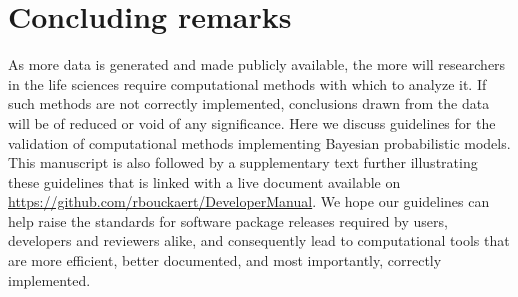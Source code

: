 \documentclass[oneside]{article}
\begin{document}

\section*{Concluding remarks}

As more data is generated and made publicly available, the more will
researchers in the life sciences require computational methods with
which to analyze it.
If such methods are not correctly implemented, conclusions drawn from
the data will be of reduced or void of any significance.
Here we discuss guidelines for the validation of computational methods
implementing Bayesian probabilistic models.
This manuscript is also followed by a supplementary text further
illustrating these guidelines that is linked with a live document
available on \href{https://github.com/rbouckaert/DeveloperManual}{https://github.com/rbouckaert/DeveloperManual}.
We hope our guidelines can help raise the standards for software
package releases required by users, developers and reviewers alike,
and consequently lead to computational tools that are more efficient,
better documented, and most importantly, correctly implemented.



\end{document}

